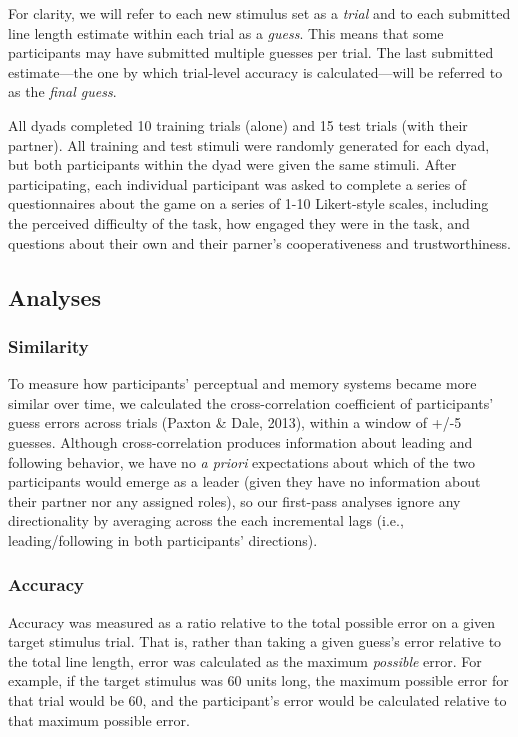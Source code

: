 \documentclass[10pt, letterpaper]{article}
\begin{document}
For clarity, we will refer to each new stimulus set as a \emph{trial}
and to each submitted line length estimate within each trial as a
\emph{guess}. This means that some participants may have submitted
multiple guesses per trial. The last submitted estimate---the one by
which trial-level accuracy is calculated---will be referred to as the
\emph{final guess}.

All dyads completed 10 training trials (alone) and 15 test trials (with
their partner). All training and test stimuli were randomly generated
for each dyad, but both participants within the dyad were given the same
stimuli. After participating, each individual participant was asked to
complete a series of questionnaires about the game on a series of 1-10
Likert-style scales, including the perceived difficulty of the task, how
engaged they were in the task, and questions about their own and their
parner's cooperativeness and trustworthiness.

\subsection{Analyses}\label{analyses}

\subsubsection{Similarity}\label{similarity}

To measure how participants' perceptual and memory systems became more
similar over time, we calculated the cross-correlation coefficient of
participants' guess errors across trials (Paxton \& Dale, 2013), within
a window of +/-5 guesses. Although cross-correlation produces
information about leading and following behavior, we have no \emph{a
priori} expectations about which of the two participants would emerge as
a leader (given they have no information about their partner nor any
assigned roles), so our first-pass analyses ignore any directionality by
averaging across the each incremental lags (i.e., leading/following in
both participants' directions).

\subsubsection{Accuracy}\label{accuracy}

Accuracy was measured as a ratio relative to the total possible error on
a given target stimulus trial. That is, rather than taking a given
guess's error relative to the total line length, error was calculated as
the maximum \emph{possible} error. For example, if the target stimulus
was 60 units long, the maximum possible error for that trial would be
60, and the participant's error would be calculated relative to that
maximum possible error.
\end{document}
